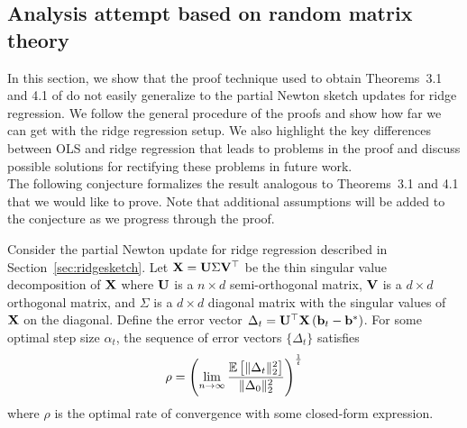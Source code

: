 \subsection{Analysis attempt based on random matrix theory} \label{sec:theory}

In this section, we show that the proof technique used to obtain Theorems~3.1 and 4.1 of \citep{Lacotte:2020} do not easily generalize to the partial Newton sketch updates for ridge regression. We follow the general procedure of the proofs and show how far we can get with the ridge regression setup. We also highlight the key differences between OLS and ridge regression that leads to problems in the proof and discuss possible solutions for rectifying these problems in future work.
\\

The following conjecture formalizes the result analogous to Theorems~3.1 and 4.1 that we would like to prove. Note that additional assumptions will be added to the conjecture as we progress through the proof.

\begin{conjecture} \label{con:ridge}
Consider the partial Newton update for ridge regression described in Section~\ref{sec:ridgesketch}. Let $\mathbf{X} = \mathbf{U}\Sigma\mathbf{V}^\top$ be the thin singular value decomposition of $\mathbf{X}$ where $\mathbf{U}$ is a $n\times d$ semi-orthogonal matrix, $\mathbf{V}$ is a $d\times d$ orthogonal matrix, and $\Sigma$ is a $d\times d$ diagonal matrix with the singular values of $\mathbf{X}$ on the diagonal. Define the error vector $\Delta_t=\mathbf{U}^\top\mathbf{X}\left(\mathbf{b}_t-\mathbf{b}^*\right)$. For some optimal step size $\alpha_t$, the sequence of error vectors $\{\Delta_t\}$ satisfies
\[
\rho = \left(\lim_{n\rightarrow\infty}\frac{\mathbb{E}\left[\|\Delta_t\|_2^2\right]}{\|\Delta_0\|_2^2}\right)^\frac{1}{t}
\]
where $\rho$ is the optimal rate of convergence with some closed-form expression.
\end{conjecture}

